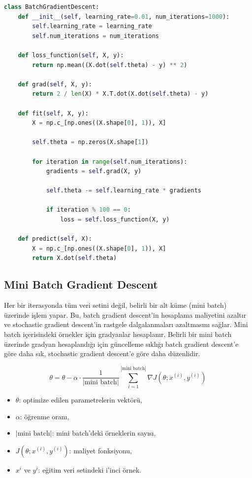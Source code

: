 \begin{lstlisting}[language=Python]
class BatchGradientDescent:
    def __init__(self, learning_rate=0.01, num_iterations=1000):
        self.learning_rate = learning_rate
        self.num_iterations = num_iterations

    def loss_function(self, X, y):
        return np.mean((X.dot(self.theta) - y) ** 2)

    def grad(self, X, y):
        return 2 / len(X) * X.T.dot(X.dot(self.theta) - y)
    
    def fit(self, X, y):
        X = np.c_[np.ones((X.shape[0], 1)), X]

        self.theta = np.zeros(X.shape[1])

        for iteration in range(self.num_iterations):
            gradients = self.grad(X, y)

            self.theta -= self.learning_rate * gradients

            if iteration % 100 == 0:
                loss = self.loss_function(X, y)

    def predict(self, X):
        X = np.c_[np.ones((X.shape[0], 1)), X]
        return X.dot(self.theta)
\end{lstlisting}

\newpage

\subsection{Mini Batch Gradient Descent}

Her bir iterasyonda tüm veri setini değil, belirli bir alt küme (mini batch) üzerinde işlem yapar. Bu, batch gradient descent'in hesaplama maliyetini azaltır ve stochastic gradient descent'in rastgele dalgalanmaları azaltmasını sağlar. Mini batch içerisindeki örnekler için gradyanlar hesaplanır. Belirli bir mini batch üzerinde gradyan hesaplandığı için güncelleme sıklığı batch gradient descent'e göre daha sık, stochastic gradient descent'e göre daha düzenlidir.

\[\theta = \theta - \alpha \cdot \frac{1}{|\text{mini batch}|} \sum_{i=1}^{|\text{mini batch}|} \nabla J(\theta;x^{(i)},y^{(i)})\]

\begin{itemize}
	\item $\theta$: optimize edilen parametrelerin vektörü,
	\item $\alpha$: öğrenme oranı,
	\item ${|\text{mini batch}|}$: mini batch'deki örneklerin sayısı,
	\item $J(\theta;x^{(i)},y^{(i)})$: maliyet fonksiyonu,
	\item $x^{i}$ ve $y^{i}$: eğitim veri setindeki i'inci örnek.
\end{itemize}

